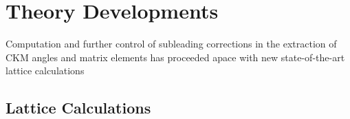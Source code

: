 %
%
%
%
%
%
%
%
%
%
\section{Theory Developments}
Computation and further control of subleading corrections in the extraction of CKM angles and matrix elements  has proceeded apace with new state-of-the-art lattice calculations 

\subsection{Lattice Calculations}

